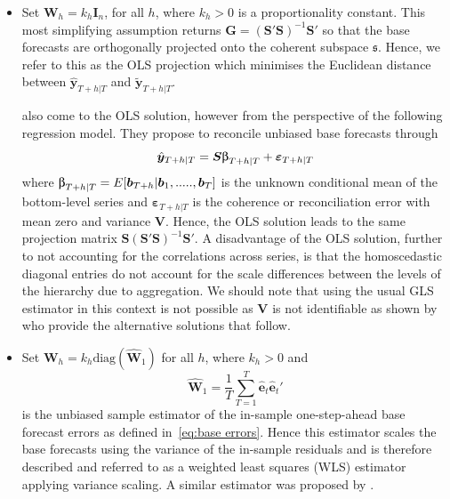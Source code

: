 \documentclass[graybox]{svmult}
\begin{document}
\begin{itemize}
    \item Set ${\bm{W}}_{h}=k_h\bm{I}_n$, for all $h$, where $k_{h} > 0$ is a proportionality constant. This most simplifying assumption returns $\bm{G}=(\bm{S}'\bm{S})^{-1}\bm{S}'$ so that the base forecasts are orthogonally projected onto the coherent subspace $\mathfrak{s}$. Hence, we refer to this as the OLS projection which minimises the Euclidean distance between $\hat{\bm{y}}_{T+h|T}$ and $\tilde{\bm{y}}_{T+h|T}$.

        \cite{HynEtAl2011} also come to the OLS solution, however from the perspective of the following regression model. They propose to reconcile unbiased base forecasts through \begin{equation*}\hat{\bm{y}}_{T+h|T} = \bm{S\ubeta}_{T+h|T} + \bm{\varepsilon}_{T+h|T} \end{equation*} where $\bm{\ubeta}_{T+h|T}=E[\bm{b}_{T+h}|\bm{b}_1,.....,\bm{b}_T]$ is the unknown conditional mean of the bottom-level series and $\bm{\varepsilon}_{T+h|T}$ is the coherence or reconciliation error with mean zero and variance $\bm{V}$. Hence, the OLS solution leads to the same projection matrix $\bm{S}(\bm{S}'\bm{S})^{-1}\bm{S}'$. A disadvantage of the OLS solution, further to not accounting for the correlations across series, is that the homoscedastic diagonal entries do not account for the scale differences between the levels of the hierarchy due to aggregation. We should note that using the usual GLS estimator in this context is not possible as $\bm{V}$ is not identifiable as shown by \cite{WicEtAl2019} who provide the alternative solutions that follow.

    \item Set ${\bm{W}}_{h}=k_{h}\text{diag}(\hat{\bm{W}}_{1})$ for all $h$, where $k_{h} > 0$ and
        $$
        \hat{\bm{W}}_{1} = \frac{1}{T}\sum_{T=1}^{T} \hat{\bm{e}}_{t}\hat{\bm{e}}_{t}'
        $$
        is the unbiased sample estimator of the in-sample one-step-ahead base forecast errors as defined in~\eqref{eq:base errors}. Hence this estimator scales the base forecasts using the variance of the in-sample residuals and is therefore described and referred to as a weighted least squares (WLS) estimator applying variance scaling. A similar estimator was proposed by \cite{Hyndman2016}.
        

\end{itemize}
\end{document}
